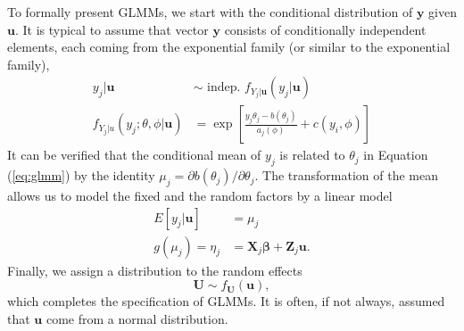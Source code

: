 		To formally present GLMMs, we start with the conditional distribution of $\bm y$ given $\bm u$. It is typical to assume that vector $\bm y$ consists of conditionally independent elements, each coming from the exponential family (or similar to the exponential family), 
		\begin{equation}\label{eq:glmm}
		\begin{split}
		   y_j|\bm u & \sim \text{~indep.~} f_{Y_j |\bm u} (y_j|\bm u) \\
		   	f_{Y_j|u}(y_j; \theta, \phi|\bm u) &= \exp \left[ \frac{y_j\theta_j	 -b(\theta_j)}{a_j(\phi)} + c(y_i, \phi)\right]
		\end{split}
		\end{equation}	
		It can be verified that the conditional mean of $y_j$ is related to $\theta_j$ in Equation (\ref{eq:glmm}) by the identity $\mu_j = \partial b(\theta_j)/\partial \theta_j$. The transformation of the mean allows us to model the fixed and the random factors by a linear model
		\begin{equation}\label{eq:glmm2}
		\begin{split}
		  E[y_j|\bm u] &= \mu_j\\
		  g(\mu_j) = \eta_j &= \bm X_j\bm \beta + \bm Z_j\bm u.
		\end{split}
		\end{equation}
		Finally, we assign a distribution to the random effects
		\begin{equation}
		\bm U \sim f_{\bm U}(\bm u),
		\end{equation}
		which completes the specification of GLMMs. It is often, if not always, assumed that $\bm u$ come from a normal distribution.

